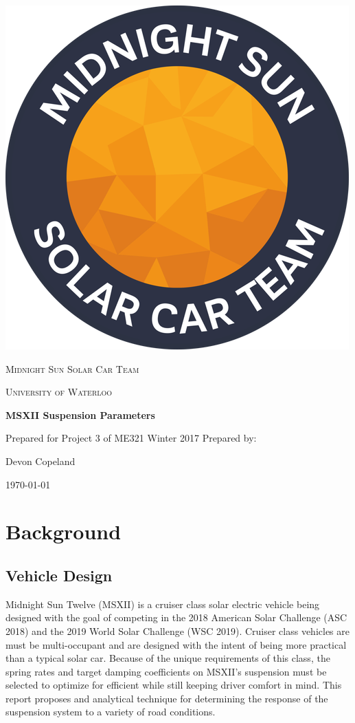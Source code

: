 \documentclass[12pt]{article}
\begin{document}
\begin{titlepage}
	\vspace*{3cm}
	\centering
	\includegraphics[width=.2\textwidth]{./LaTex/midnightSunLogoCircle.png}\par
	\vspace{1.5cm}
	{\scshape\LARGE Midnight Sun Solar Car Team \par}
	{\scshape\large University of Waterloo\par}
	\vspace{1.5cm}
	{\huge\bfseries MSXII Suspension Parameters\par}
	\vspace{0.2cm}
	\large Prepared for Project 3 of ME321 Winter 2017
	\vfill
	Prepared by:\par
	Devon Copeland\par
	\vspace{1cm}
	\today\par
\end{titlepage}

\section{Background}
\subsection{Vehicle Design}
Midnight Sun Twelve (MSXII) is a cruiser class solar electric vehicle being designed with the goal of competing in the 2018 American Solar Challenge (ASC 2018) and the 2019 World Solar Challenge (WSC 2019). Cruiser class vehicles are must be multi-occupant and are designed with the intent of being more practical than a typical solar car. Because of the unique requirements of this class, the spring rates and target damping coefficients on MSXII's suspension must be selected to optimize for efficient while still keeping driver comfort in mind. This report proposes and analytical technique for determining the response of the suspension system to a variety of road conditions. 
\end{document}
